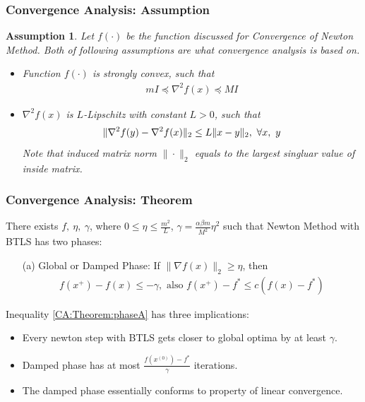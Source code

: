 \documentclass{beamer}
\newcommand{\be}{\begin{eqnarray}}
\newcommand{\ee}{\end{eqnarray}}
\newtheorem{assumption}{Assumption}
\begin{document}
\begin{frame}
    \frametitle{Convergence Analysis: Assumption}    
    \begin{assumption}
        Let $f(\cdot)$ be the function discussed for Convergence of Newton
        Method. Both of following assumptions are what convergence analysis is
        based on.
        \begin{itemize}
            \item Function $f(\cdot)$ is strongly convex, such that
        \be
        m I \preceq \nabla^2 f(x) \preceq M I
        \ee
    \item $\nabla^2 f(x)$ is $L$-Lipschitz with constant $L > 0$, such that
        \be
        \| \hessian{}{f}{y} - \hessian{}{f}{x} \|_2 \leq L \|x-y\|_2,\ 
        \forall x,\ y
        \ee
        Note that induced matrix norm $\| \cdot \|_2$ equals to the largest
        singluar value of inside matrix.
        \end{itemize}
    \end{assumption}
\end{frame}

\begin{frame}
    \frametitle{Convergence Analysis: Theorem}    
    \begin{theorem}[Part I]
        There exists $f,\ \eta,\ \gamma$, where $ 0 \leq \eta \leq \frac{m^2}{L}$,
        $\gamma = \frac{\alpha \beta m}{M^2}\eta^2$
        such that Newton Method with BTLS has two phases: 
        \begin{itemize}
            \item[(a)] Global or Damped Phase: If $\|\nabla f(x)\|_2 \geq \eta$, then 
                \be
                f(x^{+}) - f(x) \leq -\gamma, \text{ also } 
                f(x^{+}) - f^* \leq c(f(x)-f^*) \label{CA:Theorem:phaseA}
                \ee
        \end{itemize}
    \end{theorem}
        Inequality \eqref{CA:Theorem:phaseA} has three implications: 
        \begin{itemize}
            \item Every newton step with BTLS gets closer to global optima by
                at least $\gamma$.
            \item Damped phase has at most $\frac{f(x^{(0)}) -
                    f^{*}}{\gamma}$ iterations.
            \item The damped phase essentially conforms to property of linear convergence.
        \end{itemize}
\end{frame}
\end{document}
